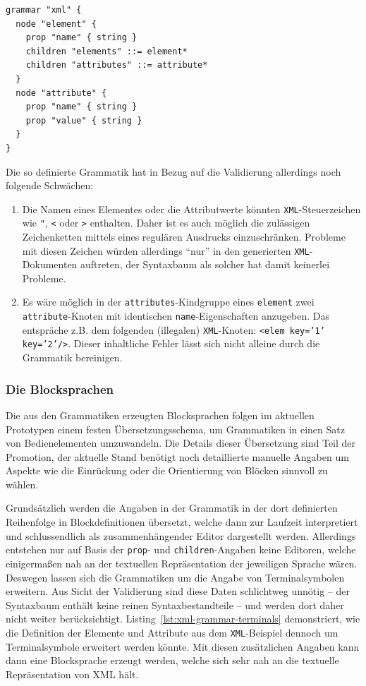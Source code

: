 \documentclass[paper=a4,fontsize=11pt,parskip=half]{scrartcl}
\begin{document}
\begin{lstlisting}[float=h, label={lst:xml-grammar-3},caption={\texttt{XML} Schritt 3 - Beziehungen zwischen Elementen und Attributen},captionpos=b,language={Grammar}]
grammar "xml" {
  node "element" {
    prop "name" { string }
    children "elements" ::= element*
    children "attributes" ::= attribute*
  }
  node "attribute" {
    prop "name" { string }
    prop "value" { string }
  }
}
\end{lstlisting}

Die so definierte Grammatik hat in Bezug auf die Validierung allerdings noch folgende Schwächen:

\begin{enumerate}
\item Die Namen eines Elementes oder die Attributwerte könnten \texttt{XML}-Steuerzeichen wie \texttt{"}, \texttt{<} oder \texttt{>} enthalten. Daher ist es auch möglich die zulässigen Zeichenketten mittels eines regulären Ausdrucks einzuschränken. Probleme mit diesen Zeichen würden allerdings \enquote{nur} in den generierten \texttt{XML}-Dokumenten auftreten, der Syntaxbaum als solcher hat damit keinerlei Probleme.
\item Es wäre möglich in der \texttt{attributes}-Kindgruppe eines \texttt{element} zwei \texttt{attribute}-Knoten mit identischen \texttt{name}-Eigenschaften anzugeben. Das entspräche z.B. dem folgenden (illegalen) \texttt{XML}-Knoten: \texttt{<elem key='1' key='2'/>}. Dieser inhaltliche Fehler lässt sich nicht alleine durch die Grammatik bereinigen.
\end{enumerate}

\subsubsection{Die Blocksprachen}

Die aus den Grammatiken erzeugten Blocksprachen folgen im aktuellen Prototypen einem festen Übersetzungsschema, um Grammatiken in einen Satz von Bedienelementen umzuwandeln. Die Details dieser Übersetzung sind Teil der Promotion, der aktuelle Stand benötigt noch detaillierte manuelle Angaben um Aspekte wie die Einrückung oder die Orientierung von Blöcken sinnvoll zu wählen.

Grundsätzlich werden die Angaben in der Grammatik in der dort definierten Reihenfolge in Blockdefinitionen übersetzt, welche dann zur Laufzeit interpretiert und schlussendlich als zusammenhängender Editor dargestellt werden. Allerdings entstehen nur auf Basis der \texttt{prop}- und \texttt{children}-Angaben keine Editoren, welche einigermaßen nah an der textuellen Repräsentation der jeweiligen Sprache wären. Deswegen lassen sich die Grammatiken um die Angabe von Terminalsymbolen erweitern. Aus Sicht der Validierung sind diese Daten schlichtweg unnötig -- der Syntaxbaum enthält keine reinen Syntaxbestandteile -- und werden dort daher nicht weiter berücksichtigt. Listing~\ref{lst:xml-grammar-terminals} demonstriert, wie die Definition der Elemente und Attribute aus dem \texttt{XML}-Beispiel dennoch um Terminalsymbole erweitert werden könnte. Mit diesen zusätzlichen Angaben kann dann eine Blocksprache erzeugt werden, welche sich sehr nah an die textuelle Repräsentation von XML hält.
\end{document}
